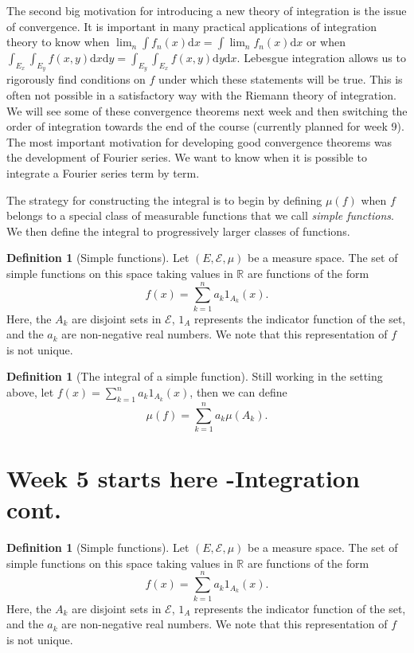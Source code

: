 \documentclass[11pt]{article}
\theoremstyle{definition}
\newtheorem{dfn}[thm]{Definition}
\theoremstyle{remark}
\begin{document}
The second big motivation for introducing a new theory of integration is the issue of convergence. It is important in many practical applications of integration theory to know when $\lim_n \int f_n(x) \mathrm{d}x = \int \lim_n f_n(x) \mathrm{d}x$ or when $\int_{E_x} \int_{E_y} f(x,y) \mathrm{d}x \mathrm{d}y = \int_{E_y} \int_{E_x} f(x,y) \mathrm{d}y \mathrm{d}x$. Lebesgue integration allows us to rigorously find conditions on $f$ under which these statements will be true. This is often not possible in a satisfactory way with the Riemann theory of integration. We will see some of these convergence theorems next week and then switching the order of integration towards the end of the course (currently planned for week 9). The most important motivation for developing good convergence theorems was the development of Fourier series. We want to know when it is possible to integrate a Fourier series term by term.

The strategy for constructing the integral is to begin by defining $\mu(f)$ when $f$ belongs to a special class of measurable functions that we call \emph{simple functions}. We then define the integral to progressively larger classes of functions. 

\begin{dfn}[Simple functions]
Let $(E, \mathcal{E}, \mu)$ be a measure space. The set of simple functions on this space taking values in $\mathbb{R}$ are functions of the form
\[ f(x) = \sum_{k=1}^n a_k 1_{A_k}(x). \] Here, the $A_k$ are disjoint sets in $\mathcal{E}$, $1_{A}$ represents the indicator function of the set, and the $a_k$ are non-negative real numbers. We note that this representation of $f$ is not unique.
\end{dfn}

\begin{dfn}[The integral of a simple function]
Still working in the setting above, let $f(x) = \sum_{k=1}^n a_k 1_{A_k}(x)$, then we can define
\[ \mu(f) = \sum_{k=1}^n a_k \mu(A_k). \]
\end{dfn}
\section{ Week 5 starts here -Integration cont.}
\begin{dfn}[Simple functions]
Let $(E, \mathcal{E}, \mu)$ be a measure space. The set of simple functions on this space taking values in $\mathbb{R}$ are functions of the form
\[ f(x) = \sum_{k=1}^n a_k 1_{A_k}(x). \] Here, the $A_k$ are disjoint sets in $\mathcal{E}$, $1_{A}$ represents the indicator function of the set, and the $a_k$ are non-negative real numbers. We note that this representation of $f$ is not unique.
\end{dfn}
\end{document}

